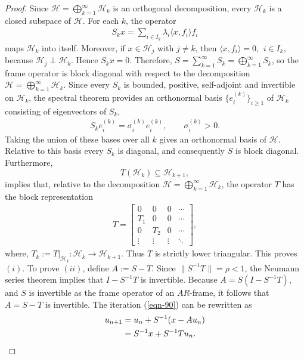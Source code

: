 \documentclass[10pt,a4paper]{amsart}
\begin{document}
\begin{proof}
Since $\mathcal H=\bigoplus_{k=1}^{\infty}\mathcal H_k$ is an
orthogonal decomposition, every $\mathcal H_k$ is a closed
subspace of $\mathcal H$. For each $k$, the operator
\begin{eqnarray*}
S_kx=\sum_{i\in I_k}\lambda_i\langle x,f_i\rangle f_i
\end{eqnarray*}
maps $\mathcal H_k$ into itself. Moreover, if $x\in\mathcal H_j$
with $j\neq k$, then $\langle x,f_i\rangle=0, \,\ i\in I_k$,
because $\mathcal H_j\perp\mathcal H_k$. Hence $S_kx=0$.
Therefore, $S=\sum_{k=1}^{\infty}S_k=\bigoplus_{k=1}^{\infty}S_k$,
so the frame operator is block diagonal with respect to the
decomposition $\mathcal H=\bigoplus_{k=1}^{\infty}\mathcal H_k$.
Since every $S_k$ is bounded, positive, self-adjoint and
invertible on $\mathcal H_k$, the spectral theorem provides an
orthonormal basis $\{e_i^{(k)}\}_{i\geq 1}$ of $\mathcal H_k$
consisting of eigenvectors of $S_k$,
\begin{eqnarray*}
S_ke_i^{(k)} = \sigma_i^{(k)}e_i^{(k)}, \qquad \sigma_i^{(k)}>0.
\end{eqnarray*}
Taking the union of these bases over all $k$ gives an orthonormal
basis of $\mathcal H$. Relative to this basis every $S_k$ is
diagonal, and consequently $S$ is block diagonal. Furthermore,
$$T(\mathcal H_k)\subseteq\mathcal H_{k+1},$$ implies that, relative
to the decomposition $\mathcal H=\bigoplus_{k=1}^{\infty}\mathcal
H_k$, the operator $T$ has the block representation
\begin{eqnarray*}
T=
\begin{bmatrix} 0&0&0&\cdots\\ T_1&0&0&\cdots\\ 0&T_2&0&\cdots\\
\vdots&\vdots&\vdots&\ddots \end{bmatrix},
\end{eqnarray*}
where, $T_k:=T|_{\mathcal H_k}:\mathcal H_k \rightarrow \mathcal
H_{k+1}$. Thus $T$ is strictly lower triangular. This proves
$(i)$. To prove $(ii)$, define $A:=S-T$. Since
$\|S^{-1}T\|=\rho<1$, the Neumann series theorem implies that
$I-S^{-1}T$ is invertible. Because $A = S(I-S^{-1}T)$, and $S$ is
invertible as the frame operator of an $AR$-frame, it follows that
$A=S-T$ is invertible. The iteration (\ref{eqn-90}) can be
rewritten as
\begin{eqnarray} \label{eqn-1000} \notag
u_{n+1} &= u_n+S^{-1}(x-Au_n)\\ &= S^{-1}x+S^{-1}Tu_n.
\end{eqnarray}


\end{proof}
\end{document}
